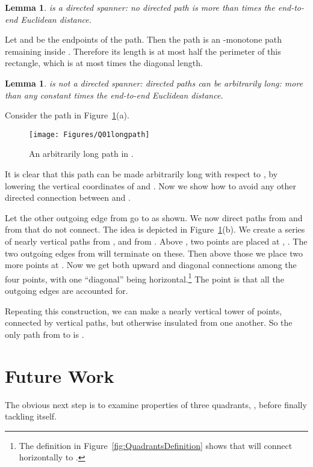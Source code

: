 \pdfoutput=1  \documentclass[]{article}
\newcommand{\ABox}{
\raisebox{3pt}{\framebox[6pt]{\rule{6pt}{0pt}}}
}
\newenvironment{proof}{{\bf Proof:}}{\hfill\ABox}
\newtheorem{lemma}[theorem]{Lemma}
\newcommand{\figlab}[1]{\label{fig:#1}}
\newcommand{\figref}[1]{\ref{fig:#1}}
\begin{document}
\begin{lemma}
 is a directed spanner:
no directed path is more than  times the end-to-end Euclidean distance.
\end{lemma}
\begin{proof}
Let  and  be the endpoints of the path.
Then the path is an -monotone path remaining inside
.  Therefore its length is at most half the perimeter of this
rectangle, which is at most  times the diagonal length.
\end{proof}

\begin{lemma}
 is not a directed spanner:
directed paths can be arbitrarily long:
more than any constant  times the end-to-end Euclidean distance.
\end{lemma}
\begin{proof}
Consider the path  in Figure~\figref{Q01longpath}(a).
\begin{figure}[htbp]
\centering
\texttt{[image: Figures/Q01longpath]}
\caption{An arbitrarily long path in  .}
\figlab{Q01longpath}
\end{figure}
It is clear that this path can be made arbitrarily long with respect to ,
by lowering the vertical coordinates of  and .
Now we show how to avoid any other directed connection between  and .

Let the other outgoing edge from  go to  as shown.
We now direct paths from  and from  that do not connect.
The idea is depicted in Figure~\figref{Q01longpath}(b).
We create a series of nearly vertical paths from , and from .
Above , two points are placed at ,
.
The two outgoing edges from  will terminate on these.
Then above those we place two more points at .
Now we get both upward and diagonal connections among the four points,
with one ``diagonal'' being horizontal.\footnote{
	The definition in Figure~\protect\figref{QuadrantsDefinition} shows that
	  will connect horizontally to .
	 }
The point is that all the outgoing edges are
accounted for.

Repeating this construction, we can make a nearly vertical tower of points,
connected by vertical paths, but otherwise insulated from one another.
So the only path from  to  is .
\end{proof}

\section{Future Work}
The obvious next step is to examine properties of three
quadrants, , before finally tackling  itself.






\end{document}
